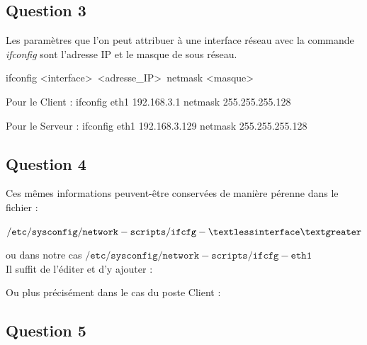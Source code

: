 \documentclass[a4paper,12pt]{article}
\begin{document}
\subsection{Question 3}

Les paramètres que l'on peut attribuer à une interface réseau avec la commande \textit{ifconfig} sont l'adresse IP et le masque de sous réseau.

ifconfig \textless interface\textgreater\  \textless adresse\_IP\textgreater\ netmask \textless masque\textgreater

Pour le Client :
ifconfig eth1 192.168.3.1 netmask 255.255.255.128


Pour le Serveur :
ifconfig eth1 192.168.3.129 netmask 255.255.255.128


\subsection{Question 4}

Ces mêmes informations peuvent-être conservées de manière pérenne dans le fichier :

$\mathtt{/etc/sysconfig/network-scripts/ifcfg-\textless interface\textgreater}$

ou dans notre cas $\mathtt{/etc/sysconfig/network-scripts/ifcfg-eth1}$\\

Il suffit de l'éditer et d'y ajouter :

\begin{center}
 \end{center}

Ou plus précisément dans le cas du poste Client :

\begin{center}
 \end{center}

\subsection{Question 5}
\end{document}
